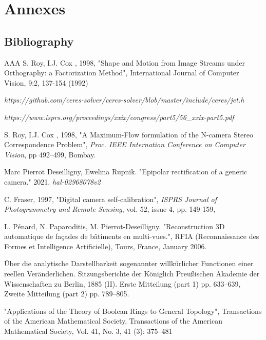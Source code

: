 


\part{Annexes}

\appendix

\chapter{Bibliography}


\begin{thebibliography}{AAA}
      S. Roy, I.J. Cox , 1998, "Shape and Motion from Image 
            Streams under Orthography: a Factorization Method", International Journal of Computer Vision, 
            9:2, 137-154 (1992)


     \emph{https://github.com/ceres-solver/ceres-solver/blob/master/include/ceres/jet.h}

     \emph{https://www.isprs.org/proceedings/xxix/congress/part5/56\_xxix-part5.pdf}

      S. Roy, I.J. Cox , 1998, "A Maximum-Flow
            formulation of the N-camera Stereo Correspondence
      Problem", \emph{Proc. IEEE Internation Conference on
      Computer Vision}, pp 492--499, Bombay.

       Marc Pierrot Deseilligny, Ewelina Rupnik. 
	   "Epipolar rectification of a generic camera." 2021. 
	   \emph{hal-02968078v2}

     C. Fraser, 1997, "Digital camera self-calibration",
   \emph{ISPRS Journal of Photogrammetry and Remote Sensing}, vol. 52, issue 4, pp. 149-159,

      L. Pénard, N. Paparoditis, M. Pierrot-Deseilligny.
           "Reconstruction 3D automatique de façades de bâtiments en multi-vues.",
            RFIA (Reconnaissance des Formes et Intelligence Artificielle),
            Tours, France, January 2006.

     Über die analytische Darstellbarkeit sogenannter willkürlicher Functionen
           einer reellen Veränderlichen. Sitzungsberichte der Königlich Preußischen Akademie der Wissenschaften zu Berlin,
           1885 (II).  Erste Mitteilung (part 1) pp. 633–639, Zweite Mitteilung (part 2) pp. 789–805.

     "Applications of the Theory of Boolean Rings to General Topology",
          Transactions of the American Mathematical Society, Transactions of the American Mathematical Society,
          Vol. 41, No. 3, 41 (3): 375–481

\end{thebibliography}


\printindex









